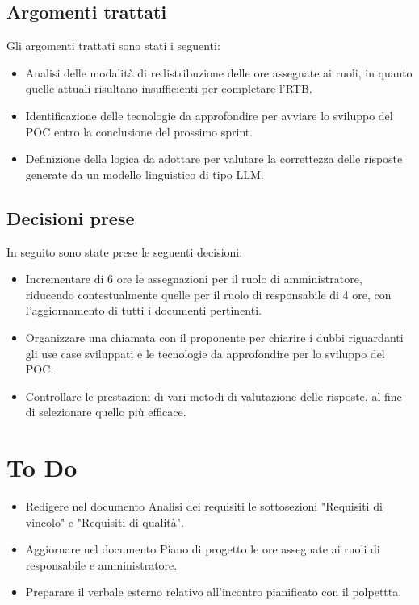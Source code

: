 \documentclass[a4paper, 12pt]{article}
\begin{document}
\subsection{Argomenti trattati}
Gli argomenti trattati sono stati i seguenti:
\begin{itemize}
    \item Analisi delle modalità di redistribuzione delle ore assegnate ai ruoli, in quanto quelle attuali risultano insufficienti per completare l'RTB.
    \item Identificazione delle tecnologie da approfondire per avviare lo sviluppo del POC entro la conclusione del prossimo sprint.
    \item Definizione della logica da adottare per valutare la correttezza delle risposte generate da un modello linguistico di tipo LLM.
\end{itemize}

\subsection{Decisioni prese}
In seguito sono state prese le seguenti decisioni:
\begin{itemize}
    \item Incrementare di 6 ore le assegnazioni per il ruolo di amministratore, riducendo contestualmente quelle per il ruolo di responsabile di 4 ore, con l'aggiornamento di tutti i documenti pertinenti.
    \item Organizzare una chiamata con il proponente per chiarire i dubbi riguardanti gli use case sviluppati e le tecnologie da approfondire per lo sviluppo del POC.
    \item Controllare le prestazioni di vari metodi di valutazione delle risposte, al fine di selezionare quello più efficace.
\end{itemize}

\section{To Do}
\begin{itemize}
    \item Redigere nel documento Analisi dei requisiti le sottosezioni "Requisiti di vincolo" e "Requisiti di qualità".
    \item Aggiornare nel documento Piano di progetto le ore assegnate ai ruoli di responsabile e amministratore.
    \item Preparare il verbale esterno relativo all'incontro pianificato con il polpettta.
\end{itemize}
\end{document}
